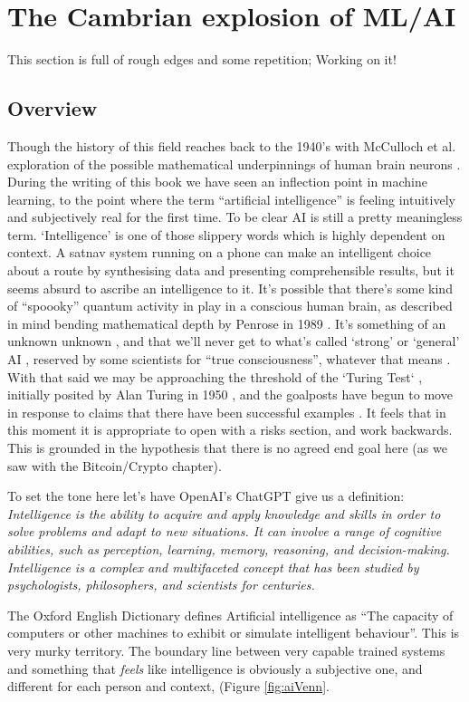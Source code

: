 \section{The Cambrian explosion of ML/AI}

This section is full of rough edges and some repetition; Working on it!

\subsection{Overview}
Though the history of this field reaches back to the 1940's with McCulloch et al. exploration of the possible mathematical underpinnings of human brain neurons \cite{mcculloch1943logical}. During the writing of this book we have seen an inflection point in machine learning, to the point where the term ``artificial intelligence'' is feeling intuitively and subjectively real for the first time.  To be clear AI is still a pretty meaningless term. `Intelligence' is one of those slippery words which is highly dependent on context. A satnav system running on a phone can make an intelligent choice about a route by synthesising data and presenting comprehensible results, but it seems absurd to ascribe an intelligence to it. It's possible that there's some kind of ``spoooky'' quantum activity in play in a conscious human brain, as described in mind bending mathematical depth by Penrose in 1989 \cite{penrose1990emperor}. It's something of an unknown unknown \cite{kerskens2022experimental}, and that we'll never get to what's called `strong' or `general' AI \cite{larson2021myth, searle1980minds}, reserved by some scientists for ``true consciousness'', whatever that means \cite{butlin2023consciousness}. With that said we may be approaching the threshold of the `Turing Test` \cite{sep-turing-test}, initially posited by Alan Turing in 1950 \cite{turing1950computing}, and the goalposts have begun to move in response to claims that there have been successful examples \cite{warwick2016can, french2012moving, french2000turing, searle2009turing}. It feels that in this moment it is appropriate to open with a risks section, and work backwards. This is grounded in the hypothesis that there is no agreed end goal here (as we saw with the Bitcoin/Crypto chapter).\par
To set the tone here let's have OpenAI's ChatGPT give us a definition:
\textit{Intelligence is the ability to acquire and apply knowledge and skills in order to solve problems and adapt to new situations. It can involve a range of cognitive abilities, such as perception, learning, memory, reasoning, and decision-making. Intelligence is a complex and multifaceted concept that has been studied by psychologists, philosophers, and scientists for centuries.}\par
The Oxford English Dictionary defines Artificial intelligence as ``The capacity of computers or other machines to exhibit or simulate intelligent behaviour''. This is very murky territory. The boundary line between very capable trained systems and something that \textit{feels} like intelligence is obviously a subjective one, and different for each person and context, (Figure \ref{fig:aiVenn}.\par

